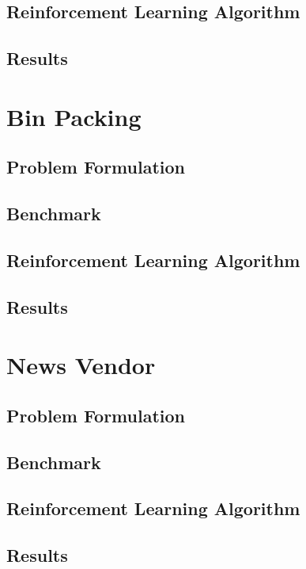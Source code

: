 \documentclass[12pt]{article}
\begin{document}
\subsection{Reinforcement Learning Algorithm}

\subsection{Results}

\section{Bin Packing}

\subsection{Problem Formulation}

\subsection{Benchmark}

\subsection{Reinforcement Learning Algorithm}

\subsection{Results}

\section{News Vendor}

\subsection{Problem Formulation}

\subsection{Benchmark}

\subsection{Reinforcement Learning Algorithm}

\subsection{Results}
\end{document}
